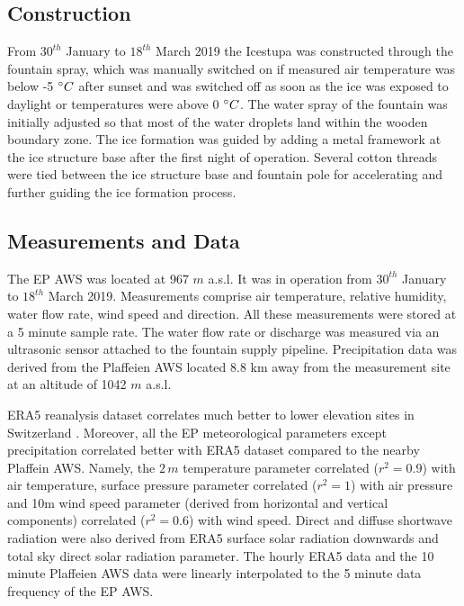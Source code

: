 \documentclass[utf8]{frontiersSCNS} %
\begin{document}
\subsection{Construction} 
From $30^{th}$ January to $18^{th}$ March 2019 the Icestupa was constructed through the fountain spray, which was
manually switched on if measured air temperature was below -5 $\degree C$ after sunset and was switched off as soon as
the ice was exposed to daylight or temperatures were above 0 $\degree C$. The water spray of the fountain was initially
adjusted so that most of the water droplets land within the wooden boundary zone. The ice formation was guided by
adding a metal framework at the ice structure base after the first night of operation.  Several cotton threads were
tied between the ice structure base and fountain pole for accelerating and further guiding the ice formation process. 

\subsection{Measurements and Data}
The EP AWS was located at 967 $m$ a.s.l. It was in operation from $30^{th}$  January to $18^{th}$ March 2019.
Measurements comprise air temperature, relative humidity, water flow rate, wind speed and direction. All these
measurements were stored at a 5 minute sample rate. The water flow rate or discharge was measured via an ultrasonic
sensor attached to the fountain supply pipeline. Precipitation data was derived from the Plaffeien AWS
\citep{meteoswiss} located 8.8 km away from the measurement site at an altitude of 1042 $m$ a.s.l.  

ERA5 reanalysis dataset \citep{era5} correlates much better to lower elevation sites in Switzerland
\citep{Scherrer_2020}. Moreover, all the EP meteorological parameters except precipitation correlated better with ERA5
dataset compared to the nearby Plaffein AWS. Namely, the $2\,m$ temperature parameter correlated ($r^2 =0.9 $) with air
temperature, surface pressure parameter correlated ($r^2 = 1$) with air pressure and 10m wind speed parameter (derived
from horizontal and vertical components) correlated ($r^2 =0.6 $) with wind speed.  Direct and diffuse shortwave
radiation were also derived from ERA5 surface solar radiation downwards and total sky direct solar radiation parameter.
The hourly ERA5 data and the 10 minute Plaffeien AWS data were linearly interpolated to the 5 minute data frequency of
the EP AWS. 
\end{document}
